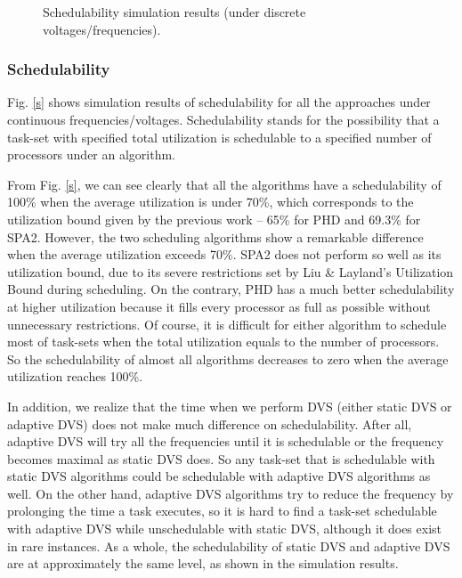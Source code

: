 \documentclass[12pt, journal,compsoc]{IEEEtran}
\begin{document}
\begin{figure*}[!t]
\centering
{}
\hspace{-0.2in}
\hspace{-0.2in}
\hspace{-0.2in}
\caption{Schedulability simulation results (under discrete voltages/frequencies).}
\label{ds}
\end{figure*}

\subsubsection{Schedulability}

Fig. \ref{s} shows simulation results of schedulability for all the
approaches under continuous frequencies/voltages.
Schedulability stands for the possibility that a task-set with specified total utilization is schedulable to a specified number of processors under an algorithm.

From Fig. \ref{s}, we can see clearly that all the algorithms have a schedulability of 100\% when the average utilization is under 70\%, which corresponds to the utilization bound given by the previous work -- 65\% for PHD and 69.3\% for SPA2. However, the two scheduling algorithms show a remarkable difference when the average utilization exceeds 70\%. SPA2 does not perform so well as its utilization bound, due to its severe restrictions set by Liu \& Layland's Utilization Bound \cite{Liu:1973:SAM:321738.321743} during scheduling. On the contrary, PHD has a much better schedulability at higher utilization because it fills every processor as full as possible without unnecessary restrictions. Of course, it is difficult for either algorithm to schedule most of task-sets when the total utilization equals to the number of processors. So the schedulability of almost all algorithms decreases to zero when the average utilization reaches 100\%.

In addition, we realize that the time when we perform DVS (either static DVS or adaptive DVS) does not make much difference on schedulability. After all, adaptive DVS will try all the frequencies until it is schedulable or the frequency becomes maximal as static DVS does. So any task-set that is schedulable with static DVS algorithms could be schedulable with adaptive DVS algorithms as well. On the other hand, adaptive DVS algorithms try to reduce the frequency by prolonging the time a task executes, so it is hard to find a task-set schedulable with adaptive DVS while unschedulable with static DVS, although it does exist in rare instances. As a whole, the schedulability of static DVS and adaptive DVS are at approximately the same level, as shown in the simulation results.
\end{document}
